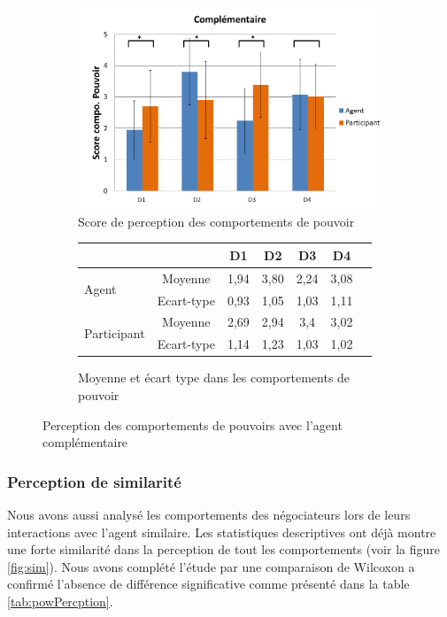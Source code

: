 			\begin{figure}[h]
			\centering
			\begin{subfigure}{0.8\textwidth}
				\centering
				\includegraphics[clip=false]{Figures/chap7/comPow.PNG}
				\caption{Score de perception des comportements de pouvoir}
			\end{subfigure}
			
			\begin{subfigure}{0.8\textwidth}
				\centering
				\begin{tabular}{l c c c c c c}
					\hline\hline
					\multicolumn{2}{c}{} & \textbf{D1} & \textbf{D2} & \textbf{D3} & \textbf{D4} \\
					\hline
					
					\multirow{2}{*}{Agent }& Moyenne & 1,94& 3,80 & 2,24 & 3,08 \\
					& Ecart-type & 0,93 & 1,05 & 1,03 & 1,11 \\
					
					\hline
					\multirow{2}{*}{Participant }& Moyenne & 2,69 & 2,94 & 3,4 & 3,02 \\
					& Ecart-type & 1,14 & 1,23 & 1,03 & 1,02\\
					\hline
					
				\end{tabular}
				\caption{Moyenne et écart type dans les comportements de pouvoir}
			\end{subfigure}
			\caption{Perception des comportements de pouvoirs avec l'agent complémentaire}
			\label{fig:comp}
		\end{figure}	
			
	\subsubsection{Perception de similarité}
		Nous avons aussi analysé les comportements des négociateurs lors de leurs interactions avec l'agent similaire. Les statistiques descriptives ont déjà montre une forte similarité dans la perception de tout les comportements (voir la figure \ref{fig:sim}). Nous avons complété l'étude par une comparaison de Wilcoxon a confirmé l'absence de différence significative comme présenté dans la table \ref{tab:powPercption}.  
	
